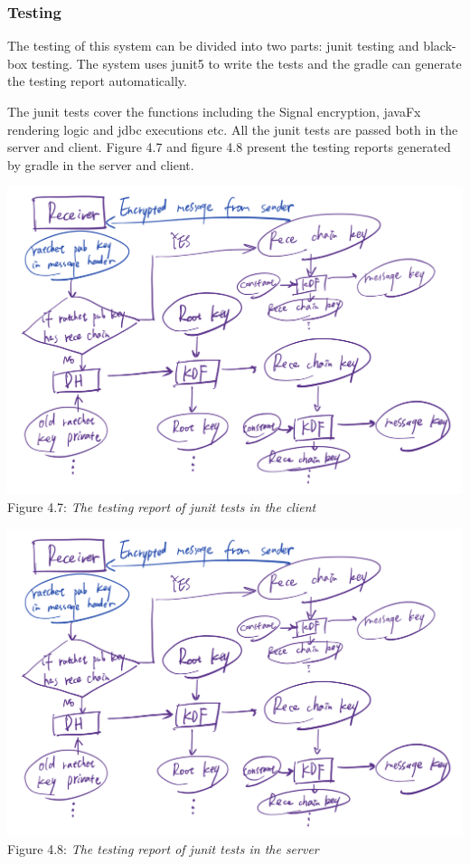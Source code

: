 \subsubsection{Testing}
The testing of this system can be divided into two parts: junit testing and black-box testing. The system uses junit5 to write the tests and the gradle can generate the testing report automatically.

The junit tests cover the functions including the Signal encryption, javaFx rendering logic and jdbc executions etc. All the junit tests are passed both in the server and client. Figure 4.7 and figure 4.8 present the testing reports generated by gradle in the server and client.

\begin{center}
\includegraphics[scale=.5]{../3-Background/resources/DH-rece.png}\\
Figure 4.7: \textit{The testing report of junit tests in the client}
\end{center}

\begin{center}
\includegraphics[scale=.5]{../3-Background/resources/DH-rece.png}\\
Figure 4.8: \textit{The testing report of junit tests in the server}
\end{center}

